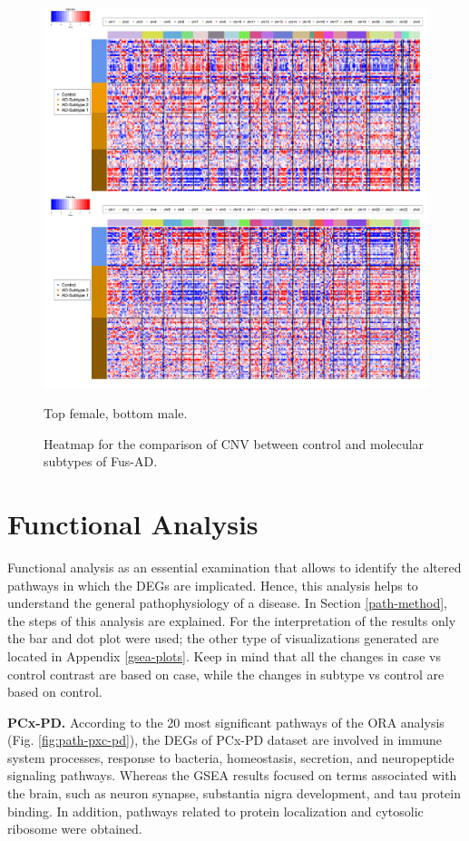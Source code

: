 \begin{figure}[!ht]
    \centerline{\includegraphics[width = 15cm]{Figures/CNV/cnv-fus.jpg}}
\caption{Heatmap for the comparison of CNV between control and molecular subtypes of Fus-AD.}
\footnotesize Top female, bottom male.
\label{fig:cnv-hm-fus}
\end{figure}

\section{Functional Analysis}

Functional analysis as an essential examination that allows to identify the altered pathways in which the DEGs are implicated. Hence, this analysis helps to understand the general pathophysiology of a disease. In Section \ref{path-method}, the steps of this analysis are explained. For the interpretation of the results only the bar and dot plot were used; the other type of visualizations generated are located in Appendix \ref{gsea-plots}. Keep in mind that all the changes in case vs control contrast are based on case, while the changes in subtype vs control are based on control.

\textbf{PCx-PD.} According to the 20 most significant pathways of the ORA analysis (Fig. \ref{fig:path-pxc-pd}), the DEGs of PCx-PD dataset are involved in immune system processes, response to bacteria, homeostasis, secretion, and neuropeptide signaling pathways. Whereas the GSEA results focused on terms associated with the brain, such as neuron synapse, substantia nigra development, and tau protein binding. In addition, pathways related to protein localization and cytosolic ribosome were obtained. 

